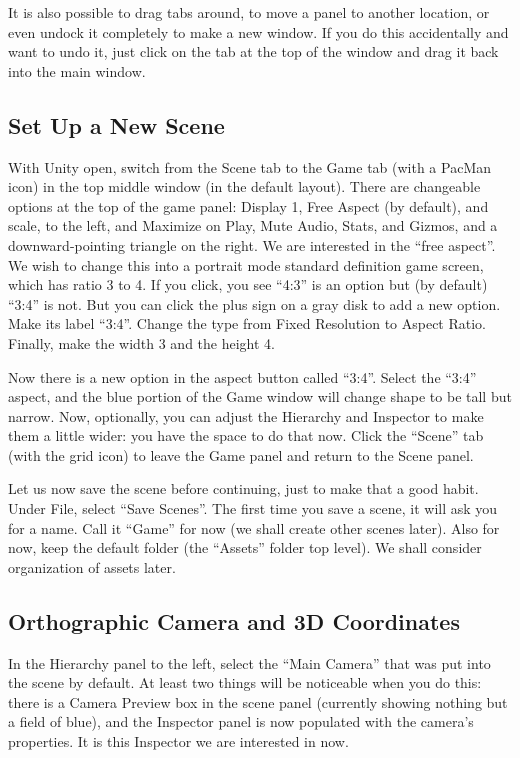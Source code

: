 \documentclass[12pt]{amsbook}
\theoremstyle{definition}
\theoremstyle{remark}
\numberwithin{figure}{chapter}
\numberwithin{table}{chapter}
\numberwithin{section}{chapter}
\numberwithin{equation}{section}
\begin{document}
It is also possible to drag tabs around, to move a panel to another location, or even undock it completely to make a new window.  If you do this accidentally and want to undo it, just click on the tab at the top of the window and drag it back into the main window.

\subsection{Set Up a New Scene}
With Unity open, switch from the Scene tab to the Game tab (with a PacMan icon) in the top middle window (in the default layout).  There are changeable options at the top of the game panel: Display 1, Free Aspect (by default), and scale, to the left, and Maximize on Play, Mute Audio, Stats, and Gizmos, and a downward-pointing triangle on the right.  We are interested in the ``free aspect''.  We wish to change this into a portrait mode standard definition game screen, which has ratio 3 to 4.  If you click, you see ``4:3'' is an option but (by default) ``3:4'' is not.  But you can click the plus sign on a gray disk to add a new option.  Make its label ``3:4''.  Change the type from Fixed Resolution to Aspect Ratio.  Finally, make the width 3 and the height 4.  

Now there is a new option in the aspect button called ``3:4''.  Select the ``3:4'' aspect, and the blue portion of the Game window will change shape to be tall but narrow.  Now, optionally, you can adjust the Hierarchy and Inspector to make them a little wider: you have the space to do that now.  Click the ``Scene'' tab (with the grid icon) to leave the Game panel and return to the Scene panel.

Let us now save the scene before continuing, just to make that a good habit.  Under File, select ``Save Scenes''.  The first time you save a scene, it will ask you for a name.  Call it ``Game'' for now (we shall create other scenes later).  Also for now, keep the default folder (the ``Assets'' folder top level).  We shall consider organization of assets later.

\subsection{Orthographic Camera and 3D Coordinates}
In the Hierarchy panel to the left, select the ``Main Camera'' that was put into the scene by default.  At least two things will be noticeable when you do this: there is a Camera Preview box in the scene panel (currently showing nothing but a field of blue), and the Inspector panel is now populated with the camera's properties.  It is this Inspector we are interested in now.
\end{document}
